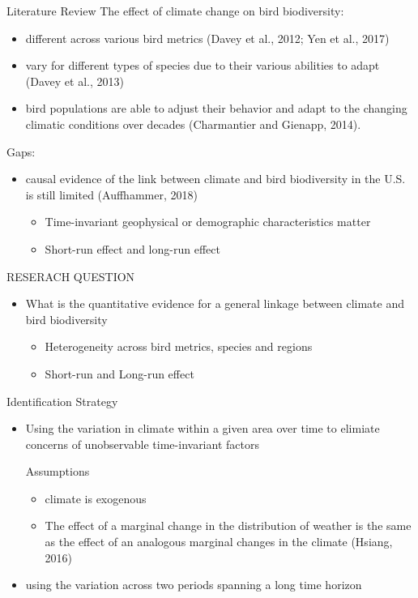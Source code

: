 \documentclass[handout]{beamer}
\begin{document}
\begin{frame}{Literature Review}
  The effect of climate change on bird biodiversity:
\begin{itemize}
  \item different across various bird metrics (Davey et al., 2012; Yen et al., 2017)
  \item vary for different types of species due to their various abilities to adapt (Davey et al., 2013)
  \item bird populations are able to adjust their behavior and adapt to the changing climatic conditions over decades (Charmantier and Gienapp, 2014).
\end{itemize}
Gaps:
\begin{itemize}
  \item causal evidence of the link between climate and bird biodiversity in the U.S. is still limited (Auffhammer, 2018)
  \begin{itemize}
    \item Time-invariant geophysical or demographic characteristics matter
    \item Short-run effect and long-run effect
  \end{itemize}
\end{itemize}
\end{frame}


\begin{frame}{RESERACH QUESTION}
  \begin{itemize}
    \item What is the quantitative evidence for a general linkage between climate and bird biodiversity
    \begin{itemize}
      \item Heterogeneity across bird metrics, species and regions
      \item Short-run and Long-run effect
    \end{itemize}
  \end{itemize}
\end{frame}


\begin{frame}{Identification Strategy}
   \begin{itemize}
     \item Using the variation in climate within a given area over time to elimiate concerns of unobservable time-invariant factors
     \begin{block}{Assumptions}
       \begin{itemize}
         \item climate is exogenous
         \item The effect of a marginal change in the distribution of weather is the same as the effect of an analogous marginal changes in the climate (Hsiang, 2016)
       \end{itemize}
     \end{block}
     \item using the variation across two periods spanning a long time horizon
   \end{itemize}
\end{frame}
\end{document}
